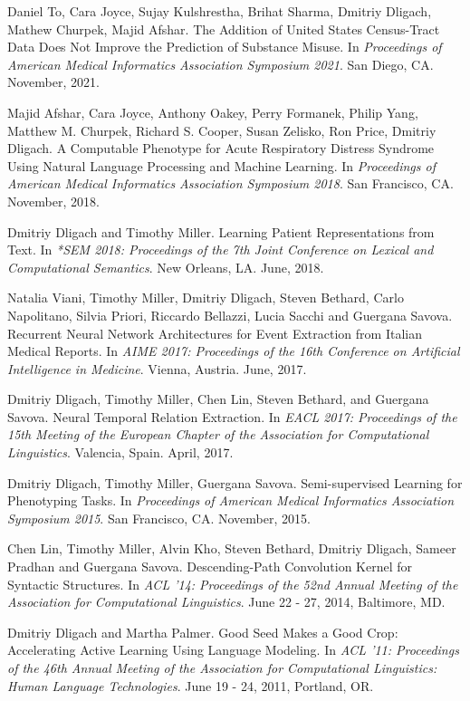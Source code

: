 \documentclass[letterpaper]{article}
\renewenvironment{itemize}{
  \begin{list}{}{
    \setlength{\leftmargin}{1.5em}
  }
}{
  \end{list}
}
\begin{document}
\begin{itemize}
\item Daniel To, Cara Joyce, Sujay Kulshrestha, Brihat Sharma, Dmitriy Dligach, Mathew Churpek, Majid Afshar. The Addition of United States Census-Tract Data Does Not Improve the Prediction of Substance Misuse. In \emph{Proceedings of American Medical Informatics Association Symposium 2021}. San Diego, CA. November, 2021.
\item Majid Afshar, Cara Joyce, Anthony Oakey, Perry Formanek, Philip Yang, Matthew M. Churpek, Richard S. Cooper, Susan Zelisko, Ron Price, Dmitriy Dligach. A Computable Phenotype for Acute Respiratory Distress Syndrome Using Natural Language Processing and Machine Learning. In \emph{Proceedings of American Medical Informatics Association Symposium 2018}. San Francisco, CA. November, 2018.
\item Dmitriy Dligach and Timothy Miller. Learning Patient Representations from Text. In \emph{*SEM 2018: Proceedings of the 7th Joint Conference on Lexical and Computational Semantics}. New Orleans, LA. June, 2018.
\item Natalia Viani, Timothy Miller, Dmitriy Dligach, Steven Bethard, Carlo Napolitano, Silvia Priori, Riccardo Bellazzi, Lucia Sacchi and Guergana Savova. Recurrent Neural Network Architectures for Event Extraction from Italian Medical Reports. In \emph{AIME 2017: Proceedings of the 16th Conference on Artificial Intelligence in Medicine}. Vienna, Austria. June, 2017.
\item Dmitriy Dligach, Timothy Miller, Chen Lin, Steven Bethard, and Guergana Savova. Neural Temporal Relation Extraction. In \emph{EACL 2017: Proceedings of the 15th Meeting of the European Chapter of the Association
for Computational Linguistics}. Valencia, Spain. April, 2017.
\item Dmitriy Dligach, Timothy Miller, Guergana Savova. Semi-supervised Learning for Phenotyping Tasks. In \emph{Proceedings of American Medical Informatics Association Symposium 2015}. San Francisco, CA. November, 2015.
\item Chen Lin, Timothy Miller, Alvin Kho, Steven Bethard, Dmitriy Dligach, Sameer Pradhan and Guergana Savova. Descending-Path Convolution Kernel for Syntactic Structures. In \emph {ACL '14: Proceedings of the 52nd Annual Meeting of the Association for Computational Linguistics}. June 22 - 27, 2014, Baltimore, MD.
\item Dmitriy Dligach and Martha Palmer. Good Seed Makes a Good Crop: Accelerating Active Learning Using Language Modeling. In \emph {ACL '11: Proceedings of the 46th Annual Meeting of the Association for Computational Linguistics: Human Language Technologies}. June 19 - 24, 2011, Portland, OR.

\end{itemize}
\end{document}

